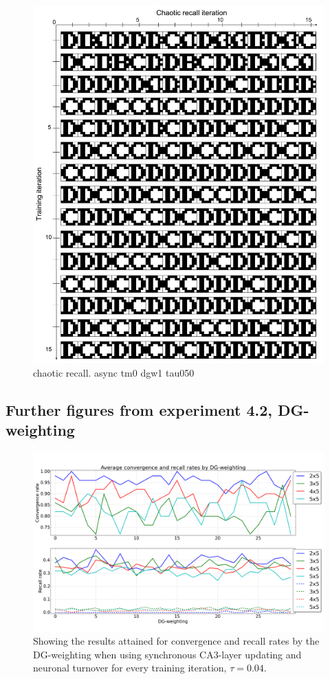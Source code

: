 \begin{figure}
    \centering
    \includegraphics[width=12cm]{fig/CD-chaotic-recall-async-tm0-dgw1-tau050}
    \caption{chaotic recall. async tm0 dgw1 tau050}
\end{figure}

\subsection*{Further figures from experiment 4.2, DG-weighting}

\begin{figure}
    \centering
    \includegraphics[width=13cm]{fig/DGWs/sync_tm1_04}
    \caption{Showing the results attained for convergence and recall rates by the DG-weighting when using synchronous CA3-layer updating and neuronal turnover for every training iteration, $\tau=0.04$.}
    \label{fig:sync_tm1_04}
\end{figure}

